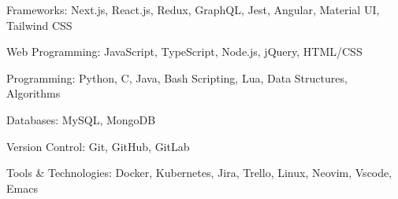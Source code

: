 
\begin{cvskills}

  \cvskill
    {Frameworks:}
    {Next.js, React.js, Redux, GraphQL, Jest, Angular, Material UI, Tailwind CSS}

    
  \cvskill
    {Web Programming:}
    {JavaScript, TypeScript, Node.js, jQuery, HTML/CSS}
    

  \cvskill
    {Programming:}
    {Python, C, Java, Bash Scripting, Lua, Data Structures, Algorithms}


  \cvskill
    {Databases:}
    {MySQL, MongoDB}


  \cvskill
    {Version Control:}
    {Git, GitHub, GitLab}

 
  \cvskill
    {Tools \& Technologies:}
    {Docker, Kubernetes, Jira, Trello, Linux, Neovim, Vscode, Emacs}


\end{cvskills}
